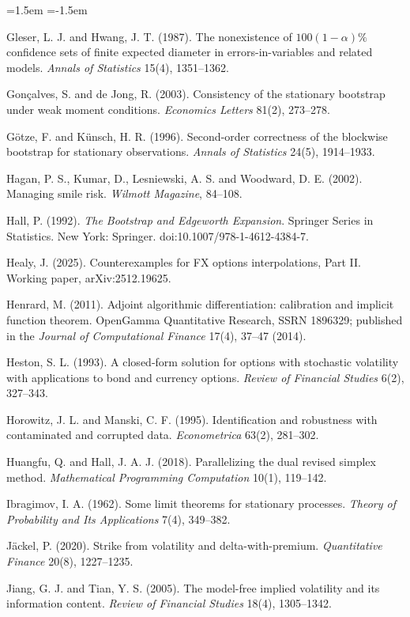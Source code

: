 \documentclass[11pt]{article}
\theoremstyle{result}
\begin{document}
\begin{list}{}{\leftmargin=1.5em \itemindent=-1.5em \itemsep=2pt \parsep=0pt}
\item Gleser, L. J. and Hwang, J. T. (1987). The nonexistence of $100(1-\alpha)\%$ confidence sets of finite expected diameter in errors-in-variables and related models. \emph{Annals of Statistics} 15(4), 1351--1362.
\item Gon\c{c}alves, S. and de Jong, R. (2003). Consistency of the stationary bootstrap under weak moment conditions. \emph{Economics Letters} 81(2), 273--278.
\item G\"otze, F. and K\"unsch, H. R. (1996). Second-order correctness of the blockwise bootstrap for stationary observations. \emph{Annals of Statistics} 24(5), 1914--1933.
\item Hagan, P. S., Kumar, D., Lesniewski, A. S. and Woodward, D. E. (2002). Managing smile risk. \emph{Wilmott Magazine}, 84--108.
\item Hall, P. (1992). \emph{The Bootstrap and Edgeworth Expansion}. Springer Series in Statistics. New York: Springer. doi:10.1007/978-1-4612-4384-7.
\item Healy, J. (2025). Counterexamples for FX options interpolations, Part II. Working paper, arXiv:2512.19625.
\item Henrard, M. (2011). Adjoint algorithmic differentiation: calibration and implicit function theorem. OpenGamma Quantitative Research, SSRN 1896329; published in the \emph{Journal of Computational Finance} 17(4), 37--47 (2014).
\item Heston, S. L. (1993). A closed-form solution for options with stochastic volatility with applications to bond and currency options. \emph{Review of Financial Studies} 6(2), 327--343.
\item Horowitz, J. L. and Manski, C. F. (1995). Identification and robustness with contaminated and corrupted data. \emph{Econometrica} 63(2), 281--302.
\item Huangfu, Q. and Hall, J. A. J. (2018). Parallelizing the dual revised simplex method. \emph{Mathematical Programming Computation} 10(1), 119--142.
\item Ibragimov, I. A. (1962). Some limit theorems for stationary processes. \emph{Theory of Probability and Its Applications} 7(4), 349--382.
\item J\"ackel, P. (2020). Strike from volatility and delta-with-premium. \emph{Quantitative Finance} 20(8), 1227--1235.
\item Jiang, G. J. and Tian, Y. S. (2005). The model-free implied volatility and its information content. \emph{Review of Financial Studies} 18(4), 1305--1342.

\end{list}
\end{document}

